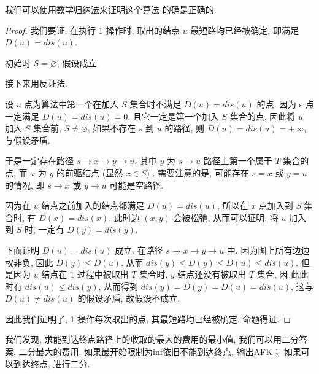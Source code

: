 我们可以使用数学归纳法来证明这个算法
的确是正确的. 

\begin{proof}
    我们要证, 在执行 1 操作时, 取出的结点 $u$ 最短路均已经被确定, 即满足 $D(u) = dis(u)$. 

初始时 $S = \varnothing$, 假设成立. 

接下来用反证法. 

设 $u$ 点为算法中第一个在加入 $S$ 集合时不满足 $D(u) = dis(u)$ 的点. 
因为 s 点一定满足 $D(u)=dis(u)=0$, 
且它一定是第一个加入 $S$ 集合的点, 因此将 $u$ 加入 $S$ 集合前, $S \neq \varnothing$, 
如果不存在 $s$ 到 $u$ 的路径, 则 $D(u) = dis(u) = +\infty$, 与假设矛盾. 

于是一定存在路径 $s \to x \to y \to u$, 其中 $y$ 为 $s \to u$ 路径上第一个属于 $T$
集合的点, 而 $x$ 为 $y$ 的前驱结点 (显然 $x \in S$) . 需要注意的是, 可能存在 $s = x$ 或 
$y = u$ 的情况, 即 $s \to x$ 或 $y \to u$ 可能是空路径. 

因为在 $u$ 结点之前加入的结点都满足 $D(u) = dis(u)$, 所以在 $x$ 点加入到 $S$ 集合时, 
有 $D(x) = dis(x)$, 此时边 $(x,y)$ 会被松弛, 从而可以证明, 
将 $u$ 加入到 $S$ 时, 一定有 $D(y)=dis(y)$. 

下面证明 $D(u) = dis(u)$ 成立. 在路径 $s \to x \to y \to u$ 中, 
因为图上所有边边权非负, 因此 $D(y) \leq D(u)$. 从而 $dis(y) \leq D(y) \leq D(u)\leq dis(u)$. 
但是因为 $u$ 结点在 $1$ 过程中被取出 $T$ 集合时, $y$ 结点还没有被取出 $T$ 集合, 因
此此时有 $dis(u)\leq dis(y)$, 从而得到 $dis(y) = D(y) = D(u) = dis(u)$, 这与 
$D(u)\neq dis(u)$ 的假设矛盾, 故假设不成立. 

因此我们证明了, 1 操作每次取出的点, 其最短路均已经被确定. 命题得证. 
\end{proof}

 我们发现, 求能到达终点路径上的收取的最大的费用的最小值, 
我们可以用二分答案, 二分最大的费用. 如果最开始限制为inf依旧不能到达终点, 输出AFK；
如果可以到达终点, 进行二分.



